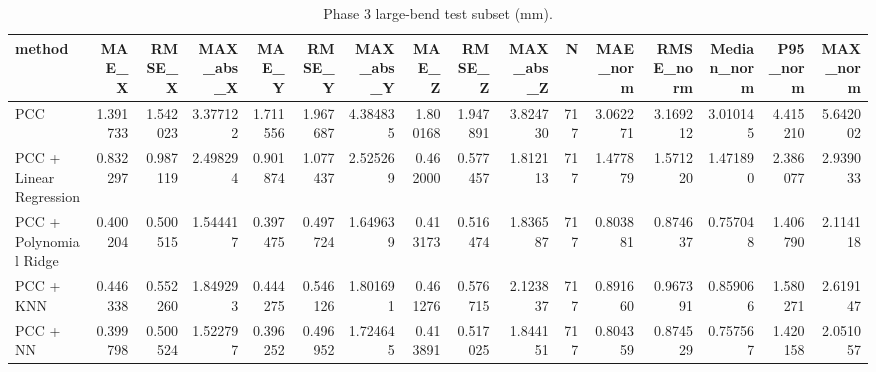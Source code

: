 \begin{table}
\caption{Phase 3 large-bend test subset (mm).}
\label{tab:phase3_extended_boundary}
\begin{tabular}{lrrrrrrrrrrrrrrr}
\toprule
method & MAE_X & RMSE_X & MAX_abs_X & MAE_Y & RMSE_Y & MAX_abs_Y & MAE_Z & RMSE_Z & MAX_abs_Z & N & MAE_norm & RMSE_norm & Median_norm & P95_norm & MAX_norm \\
\midrule
PCC & 1.391733 & 1.542023 & 3.377122 & 1.711556 & 1.967687 & 4.384835 & 1.800168 & 1.947891 & 3.824730 & 717 & 3.062271 & 3.169212 & 3.010145 & 4.415210 & 5.642002 \\
PCC + Linear Regression & 0.832297 & 0.987119 & 2.498294 & 0.901874 & 1.077437 & 2.525269 & 0.462000 & 0.577457 & 1.812113 & 717 & 1.477879 & 1.571220 & 1.471890 & 2.386077 & 2.939033 \\
PCC + Polynomial Ridge & 0.400204 & 0.500515 & 1.544417 & 0.397475 & 0.497724 & 1.649639 & 0.413173 & 0.516474 & 1.836587 & 717 & 0.803881 & 0.874637 & 0.757048 & 1.406790 & 2.114118 \\
PCC + KNN & 0.446338 & 0.552260 & 1.849293 & 0.444275 & 0.546126 & 1.801691 & 0.461276 & 0.576715 & 2.123837 & 717 & 0.891660 & 0.967391 & 0.859066 & 1.580271 & 2.619147 \\
PCC + NN & 0.399798 & 0.500524 & 1.522797 & 0.396252 & 0.496952 & 1.724645 & 0.413891 & 0.517025 & 1.844151 & 717 & 0.804359 & 0.874529 & 0.757567 & 1.420158 & 2.051057 \\
\bottomrule
\end{tabular}
\end{table}
